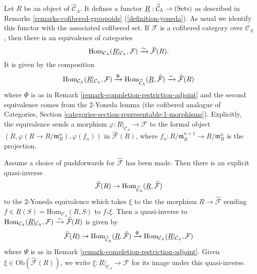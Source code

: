 \begin{remark}
\label{remark-formal-objects-yoneda}
Let $R$ be an object of $\widehat{\mathcal C}_{\Lambda}$.  It defines a functor 
$\underline{R}: \widehat{\mathcal C}_{\Lambda} \rightarrow \textnormal{(Sets)}$ 
as described in Remarks \ref{remarks-cofibered-groupoids} 
(\ref{definition-yoneda}). As usual we identify this functor with the 
associated cofibered set.  If $\mathcal F$ is a cofibered category over 
$\mathcal C_{\Lambda}$, then there is an equivalence of categories
\[
\textnormal{Hom}_{\mathcal C_{\Lambda}}(\underline{R}|_{\mathcal C_{\Lambda}}, 
\mathcal F) 
\xrightarrow{\sim} 
\widehat{\mathcal F}(R).
\]
It is given by the composition
\[
\textnormal{Hom}_{\mathcal C_{\Lambda}}(\underline{R}|_{\mathcal C_{\Lambda}}, 
\mathcal F) 
\xrightarrow{\Phi} 
\textnormal{Hom}_{\widehat{\mathcal C}_{\Lambda}}(\underline{R}, 
\widehat{\mathcal F}) 
\xrightarrow{\sim}
\widehat{\mathcal F}(R)
\]
where $\Phi$ is as in Remark \ref{remark-completion-restriction-adjoint} and 
the second equivalence comes from the 2-Yoneda lemma (the cofibered analogue of 
Categories, Section \ref{categories-section-representable-1-morphisms}).
Explicitly, the equivalence sends a 
morphism $\varphi: \underline{R}|_{\mathcal C_{\Lambda}} \rightarrow \mathcal 
F$ to the formal object $(R, \varphi(R \rightarrow R/\mathfrak{m}_R^n), 
\varphi(f_n))$ in $\widehat{\mathcal F}(R)$, where $f_{n}: 
R/\mathfrak{m}_R^{n+1} \rightarrow R/\mathfrak{m}_{R}^{n}$ is the projection.  

\medskip \noindent
Assume a choice of pushforwards for $\widehat{\mathcal F}$ has been made.  Then 
there is an explicit quasi-inverse
\[ \widehat{\mathcal F}(R) \rightarrow \textnormal{Hom}_{\widehat{\mathcal 
C}_{\Lambda}}(\underline{R}, \widehat{\mathcal F}) \]
to the 2-Yoneda equivalence which takes $\xi$ to the the morphism 
$\underline{R} \rightarrow \widehat{\mathcal F}$ sending $f \in 
\underline{R}(S) = \text{Hom}_{\mathcal C_{\Lambda}}(R,S)$ to $f_* \xi$.  Then 
a quasi-inverse to $\textnormal{Hom}_{\mathcal 
C_{\Lambda}}(\underline{R}|_{\mathcal C_{\Lambda}}, \mathcal F) 
\xrightarrow{\sim} 
\widehat{\mathcal F}(R)$ is given by
\[
\widehat{\mathcal F}(R) 
\rightarrow 
\textnormal{Hom}_{\widehat{\mathcal C}_{\Lambda}}(\underline{R}, 
\widehat{\mathcal F})
\xrightarrow{\Psi}
\textnormal{Hom}_{\mathcal C_{\Lambda}}(\underline{R}|_{\mathcal C_{\Lambda}}, 
\mathcal F)
\]
where $\Psi$ is as in Remark \ref{remark-completion-restriction-adjoint}.  
Given $\xi \in \text{Ob}(\widehat{\mathcal F}(R))$, we write $\underline{\xi}: 
\underline{R}|_{\mathcal C_{\Lambda}} \rightarrow \mathcal F$ for its image 
under this quasi-inverse.
\end{remark}

